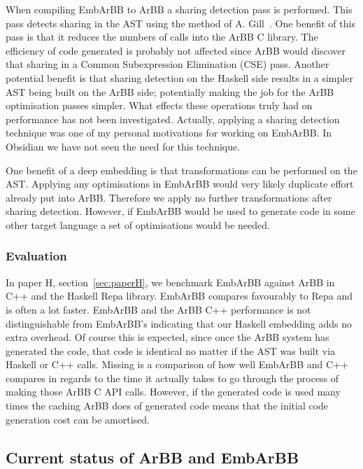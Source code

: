 \documentclass[a4paper]{book}
\begin{document}
When compiling EmbArBB to ArBB a sharing detection pass is performed. This pass detects 
sharing in the AST using the method of A. Gill~\citet{Gill}. One benefit of this pass 
is that it reduces the numbers of calls into the ArBB C library. The efficiency of code 
generated is probably not affected since ArBB would discover that sharing in a Common 
Subexpression Elimination (CSE) pass. Another potential benefit is that sharing detection 
on the Haskell side results in a simpler AST being built on the ArBB side; potentially making 
the job for the ArBB optimisation passes simpler. What effects these 
operations truly had on performance has not been investigated. Actually, applying a sharing 
detection technique was one of my personal motivations for working on EmbArBB. In Obsidian 
we have not seen the need for this technique.

One benefit of a deep embedding is that transformations can be performed on the AST. Applying 
any optimisations in EmbArBB would very likely duplicate effort already put into ArBB. 
Therefore we apply no further transformations after sharing detection. However, if EmbArBB 
would be used to generate code in some other target language a set of optimisations 
would be needed.  

\subsubsection{Evaluation} 

In paper H, section~\ref{sec:paperH}, we benchmark EmbArBB against ArBB in C++ and the Haskell 
Repa library. EmbArBB compares favourably to Repa and is often a lot faster. EmbArBB and the ArBB 
C++ performance is not distinguishable from EmbArBB's indicating that our Haskell embedding 
adds no extra overhead. Of course this is expected, since once the ArBB system has generated 
the code, that code is identical no matter if the AST was built via Haskell or C++ calls. 
Missing is a comparison of how well EmbArBB and C++ compares in regards to the time it actually 
takes to go through the process of making those ArBB C API calls. However, if the generated 
code is used many times the caching ArBB does of generated code means that the initial code 
generation cost can be amortised. 

\subsection{Current status of ArBB and EmbArBB} 
\end{document}
